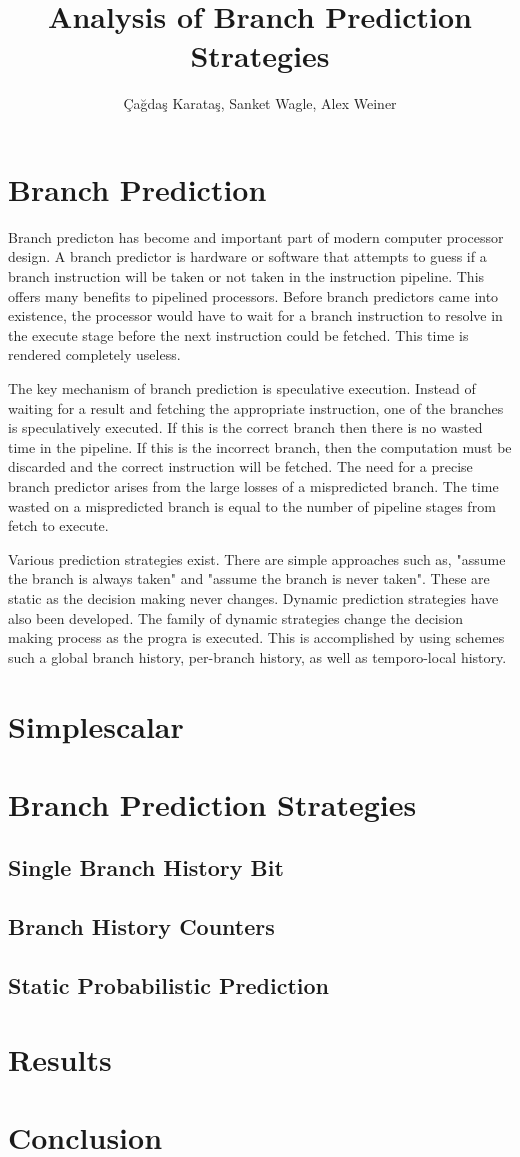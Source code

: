 \documentclass[a4paper,12pt]{article}
\begin{document}
\author{\c{C}a\u{g}da\c{s} Karata\c{s}, Sanket Wagle, Alex Weiner}
\title{Analysis of Branch Prediction Strategies}
\maketitle

\section{Branch Prediction}
Branch predicton has become and important part of modern computer processor design. A branch predictor is hardware or software that attempts to guess if a branch instruction will be taken or not taken in the instruction pipeline. This offers many benefits to pipelined processors. Before branch predictors came into existence, the processor would have to wait for a branch instruction to resolve in the execute stage before the next instruction could be fetched. This time is rendered completely useless. 

The key mechanism of branch prediction is speculative execution. Instead of waiting for a result and fetching the appropriate instruction, one of the branches is speculatively executed. If this is the correct branch then there is no wasted time in the pipeline. If this is the incorrect branch, then the computation must be discarded and the correct instruction will be fetched. The need for a precise branch predictor arises from the large losses of a mispredicted branch. The time wasted on a mispredicted branch is equal to the number of pipeline stages from fetch to execute.

Various prediction strategies exist. There are simple approaches such as, "assume the branch is always taken" and "assume the branch is never taken". These are static as the decision making never changes. Dynamic prediction strategies have also been developed. The family of dynamic strategies change the decision making process as the progra is executed. This is accomplished by using schemes such a global branch history, per-branch history, as well as temporo-local history.

\section{Simplescalar}
\section{Branch Prediction Strategies}
\subsection{Single Branch History Bit}
\subsection{Branch History Counters}
\subsection{Static Probabilistic Prediction}
\section{Results}
\section{Conclusion}
\end{document}
